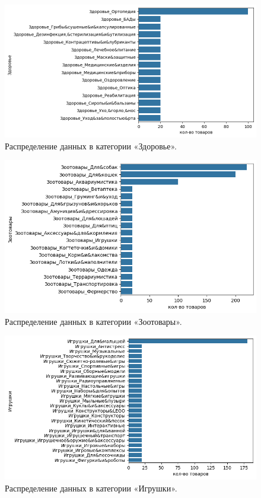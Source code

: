 \documentclass[a4paper,12pt]{extarticle}
\begin{document}
\begin{figure}[hbtp]
	\centering
	\includegraphics[scale=0.8]{приложения/amount_of_category_Здоровье.png}
	\caption{Распределение данных в категории «Здоровье».}
	\label{fig:amount_of_category_Здоровье}
\end{figure}

\begin{figure}[hbtp]
	\centering
	\includegraphics[scale=0.8]{приложения/amount_of_category_Зоотовары.png}
	\caption{Распределение данных в категории «Зоотовары».}
	\label{fig:amount_of_category_Зоотовары}
\end{figure}

\begin{figure}[hbtp]
	\centering
	\includegraphics[scale=0.8]{приложения/amount_of_category_Игрушки.png}
	\caption{Распределение данных в категории «Игрушки».}
	\label{fig:amount_of_category_Игрушки}
\end{figure}
\end{document}

